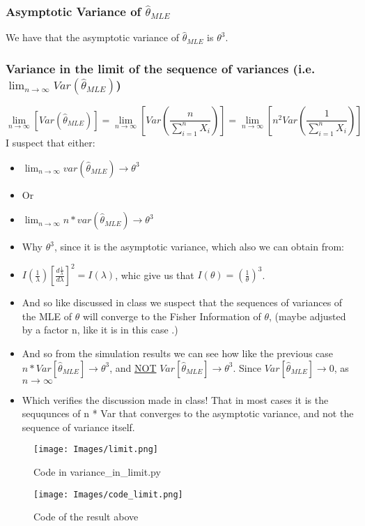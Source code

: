\documentclass[12pt]{article}
\begin{document}
\subsubsection*{Asymptotic Variance of $\hat{\theta}_{MLE}$}
We have that the asymptotic variance of $\hat{\theta}_{MLE}$ is $\theta^3$.
\subsubsection*{Variance in the limit of the sequence of variances (i.e. $\lim_{n\to \infty} Var(\hat{\theta}_{MLE})$)}
\[
\lim_{n \to \infty }[Var(\hat{\theta}_{MLE})] = \lim_{n \to \infty }[Var(\frac{n}{\sum_{i=1}^{n}X_i})] = \lim_{n \to \infty }[n^2Var(\frac{1}{\sum_{i=1}^{n}X_i})] 
\]
I suspect that either: 
\begin{itemize}
  \item $\lim_{n \to \infty} var(\hat{\theta}_{MLE}) \to \theta^3$
  \item Or 
  \item $\lim_{n \to \infty} n*var(\hat{\theta}_{MLE}) \to \theta^3$ 
  \item Why $\theta^3$, since it is the asymptotic variance, which also we can obtain from: 
  \item $I(\frac{1}{\lambda})[\frac{d\frac{1}{\lambda}}{d\lambda}]^2=I(\lambda)$, whic give us that $I(\theta) = (\frac{1}{\theta})^3$. 
  \item And  so like discussed in class we suspect that the sequences of variances of the MLE of $\theta$ will converge to the Fisher Information of $\theta$, (maybe adjusted by a factor n, like it is in this case .)
  \item And so from the simulation results we can see how like the previous case $n*Var[\hat{\theta}_{MLE}] \to \theta^3$, and \underline{NOT} $Var[\hat{\theta}_{MLE}] \to \theta^3$. Since $Var[\hat{\theta}_{MLE}]\to 0$, as $n \to \infty$
  \item Which verifies the discussion made in class! That in most cases it is the  seququnces of n * Var that converges to the asymptotic variance, and not the sequence of variance itself.
\end{itemize}
\begin{figure}[H]
  \centering
  \texttt{[image: Images/limit.png]}
  \caption{Code in variance\_in\_limit.py}
\end{figure}
\begin{figure}[H]
  \centering
  \texttt{[image: Images/code\_limit.png]}
  \caption{Code of the result above}
\end{figure}
\end{document}
